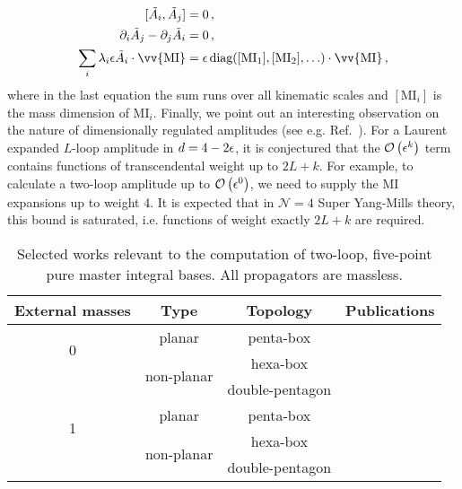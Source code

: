 \documentclass[main.tex]{subfiles}
\begin{document}
\begin{subequations}
\begin{align}
    [ \tilde{A}_i, \tilde{A}_j] &= 0\,, \\
    \partial_i \tilde{A}_j - \partial_j \tilde{A}_i &= 0\,, \\
    \sum_i \lambda_i \eps \tilde{A}_i \cdot \vv{\text{MI}} &= \eps \, \text{diag}([\text{MI}_1], [\text{MI}_2], \ldots) \cdot \vv{\text{MI}} \,,
\end{align}
\end{subequations}
where in the last equation the sum runs over all kinematic scales and $[\text{MI}_i]$ is the mass dimension of MI$_i$. Finally, we point out an interesting observation on the nature of dimensionally regulated amplitudes (see e.g. Ref.~\cite{Duhr:2014woa}). For a Laurent expanded $L$-loop amplitude in $d = 4- 2\epsilon$, it is conjectured that the $\mathcal{O}\left(\epsilon^k\right)$ term contains functions of transcendental weight up to $2L+k$. For example, to calculate a two-loop amplitude up to $\mathcal{O}\left(\epsilon^0\right)$, we need to supply the MI expansions up to weight 4. It is expected that in $\mathcal{N}=4$ Super Yang-Mills theory, this bound is saturated, i.e. functions of weight exactly $2L+k$ are required.
\begin{table}[t]
	\begin{center}
		\begin{tabular}{|c|c|c|c|}
            \hline
            External masses & Type & Topology & Publications \\
			\hline
            \multirow{2}{0cm}{0} & planar & penta-box & \cite{Gehrmann:2015bfy,Papadopoulos:2015jft, Gehrmann:2018yef, Abreu:2018aqd, Chicherin:2020oor} \\
            \cline{2-4}
            & \multirow{2}{2cm}{non-planar} & hexa-box & \cite{Chicherin:2018mue, Chicherin:2017dob, Chicherin:2018ubl, Chicherin:2018wes, Abreu:2018rcw, Chicherin:2020oor, Abreu:2018aqd} \\
            & & double-pentagon & \cite{Chicherin:2018old, Abreu:2018aqd, Chicherin:2020oor} \\
            \hline
            \multirow{2}{0cm}{1} & planar & penta-box & \cite{Papadopoulos:2015jft, Abreu:2020jxa, Chicherin:2021dyp, Canko:2020ylt} \\
            \cline{2-4}
            & \multirow{2}{2cm}{non-planar} & hexa-box & \cite{abreu2021twoloop, Kardos:2022tpo, Papadopoulos:2019iam, Chicherin:2021dyp} \\
            & & double-pentagon & \cite{Abreu:2023rco} \\
            \hline
		\end{tabular}
\end{center}
\caption{Selected works relevant to the computation of two-loop, five-point pure master integral bases. All propagators are massless.}
\label{tab:MIs}
\end{table}
\end{document}
